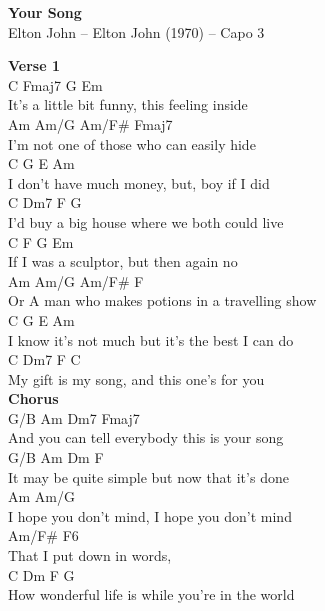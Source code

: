 \documentclass[a4paper]{article}
\begin{document}
    \begin{center}
        \textbf{Your Song}
        ~\\
        Elton John -- Elton John (1970)
         -- Capo 3
    \end{center}
    {
        \scriptsize
        \textbf{Verse 1}
        ~\\
        {
            \cutive
            \obeyspaces
C                  Fmaj7 G               Em
\\
It's a little bit funny,  this feeling inside
\\
Am             Am/G       Am/F\#      Fmaj7
\\
I'm not one of those who can easily hide
\\
C                  G         E         Am
\\
I don't have much money, but, boy if I did
\\
C             Dm7        F               G
\\
I'd buy a big house where we both could live
\\
C              F    G              Em
\\
If I was a sculptor, but then again no
\\
     Am            Am/G       Am/F\#         F
\\
Or A man who makes potions in a travelling show
\\
   C             G                 E        Am
\\
I know it's not much but it's the best I can do
\\
C              Dm7     F                C
\\
My gift is my song, and this one's for you
\\

        }
        \textbf{Chorus}
        ~\\
        {
            \cutive
            \obeyspaces
G/B              Am      Dm7            Fmaj7
\\
And you can tell everybody this is your song
\\
G/B       Am            Dm               F
\\
It may be quite simple but now that it's done
\\
Am                    Am/G
\\
I hope you don't mind, I hope you don't mind
\\
Am/F\#                F6
\\
That I put down in words,
\\
      C        Dm            F             G
\\
How wonderful life is while you're in the world
\\

}}
\end{document}

